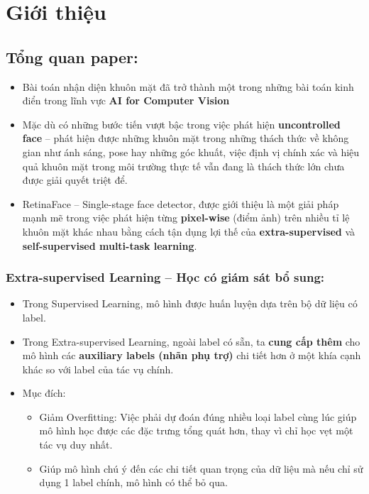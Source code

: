 \documentclass[12pt, a4paper, oneside]{book}
\theoremstyle{plain}
\numberwithin{equation}{chapter} \DeclareMathOperator{\Var}{var}
\begin{document}
\newpage
{} 
\tableofcontents
\newpage

\setcounter{page}{1}
\pagestyle{myheadings}

\chapter{Giới thiệu}
\section{Tổng quan paper: }
\begin{itemize}
    \item[--] Bài toán nhận diện khuôn mặt đã trở thành một trong những bài toán kinh điển trong lĩnh vực \textbf{AI for Computer Vision}
    \item[--] Mặc dù có những bước tiến vượt bậc trong việc phát hiện \textbf{uncontrolled face} -- phát hiện được những khuôn mặt trong những thách thức về không gian như ánh sáng, pose hay những góc khuất, việc định vị chính xác và hiệu quả khuôn mặt trong môi trường thực tế vẫn đang là thách thức lớn chưa được giải quyết triệt để. 
    \item[--] RetinaFace -- Single-stage face detector, được giới thiệu là một giải pháp mạnh mẽ trong việc phát hiện từng \textbf{pixel-wise} (điểm ảnh) trên nhiều tỉ lệ khuôn mặt khác nhau bằng cách tận dụng lợi thế của \textbf{extra-supervised} và \textbf{self-supervised multi-task learning}.
\end{itemize}

\subsection{Extra-supervised Learning -- Học có giám sát bổ sung:}
\begin{itemize}
    \item[--] Trong Supervised Learning, mô hình được huấn luyện dựa trên bộ dữ liệu có label.
    \item[--] Trong Extra-supervised Learning, ngoài label có sẵn, ta \textbf{cung cấp thêm} cho mô hình các \textbf{auxiliary labels (nhãn phụ trợ)} chi tiết hơn ở một khía cạnh khác so với label của tác vụ chính.
    \item[--] Mục đích:
    \begin{itemize}
        \item[+] Giảm Overfitting: Việc phải dự đoán đúng nhiều loại label cùng lúc giúp mô hình học được các đặc trưng tổng quát hơn, thay vì chỉ học vẹt một tác vụ duy nhất.
        \item[+] Giúp mô hình chú ý đến các chi tiết quan trọng của dữ liệu mà nếu chỉ sử dụng 1 label chính, mô hình có thể bỏ qua.
    \end{itemize}
\end{itemize}
\end{document}
